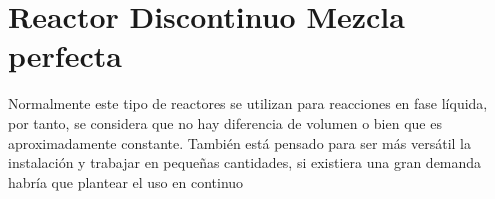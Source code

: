 \chapter{Reactor Discontinuo Mezcla perfecta}
\begin{raggedright}
    Normalmente este tipo de reactores se utilizan para reacciones en fase líquida, por tanto, se considera que no hay diferencia de volumen o bien que es aproximadamente constante.
    También está pensado para ser más versátil la instalación y trabajar en pequeñas cantidades, si existiera una gran demanda habría que plantear el uso en continuo
\end{raggedright}\\


